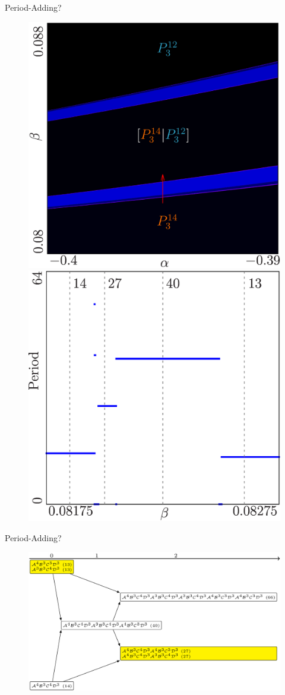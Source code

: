 \begin{frame}{Period-Adding?}
	\vspace{-1em}
	\begin{figure}
		\includegraphics[width=.4 \textwidth]{Figs/archetypal_model_full_add_hor_2D.png}
		\qquad
		\includegraphics[width=.4 \textwidth]{Figs/archetypal_model_full_add_hor_1D.png}
	\end{figure}
\end{frame}

\begin{frame}{Period-Adding?}
	\vspace{-1em}
	\begin{figure}
		\includegraphics[width=.7 \textwidth]{Figs/Trees/FullArchetypal/adding.png}
	\end{figure}
\end{frame}

